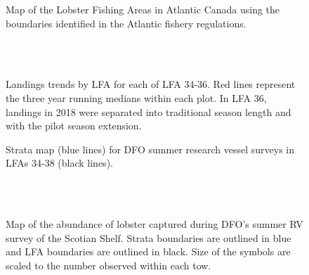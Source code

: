 \documentclass[11pt]{article}
\newcommand{\D}{.}
\newcommand{\e}{/SpinDr/backup/bio_data/bio.lobster/figures/LFA3438Framework2019/} %
\begin{document}
\begin{landscape}
\begin{figure}
\centering
    \caption{Map of the Lobster Fishing Areas in Atlantic Canada using the boundaries identified in the Atlantic fishery regulations.}

\end{figure}
\end{landscape}

\begin{figure}
        \centering
    \\
                \\
                
         \caption{Landings trends by LFA for each of LFA 34-36. Red lines represent the three year running medians within each plot. In LFA 36, landings in 2018 were separated into traditional season length and with the pilot season extension.}
        \end{figure}


    \begin{figure}
    \centering
        \caption{Strata map (blue lines) for DFO summer research vessel surveys in LFAs 34-38 (black lines).}
    \end{figure}


        \begin{figure}
        \centering
           \\
        \\
    
       \caption{Map of the abundance of lobster captured during DFO's summer RV survey of the Scotian Shelf. Strata boundaries are outlined in blue and LFA  boundaries are outlined in black. Size of the symbols are scaled to the number observed within each tow.}
        \end{figure}
        \clearpage
\end{document}
